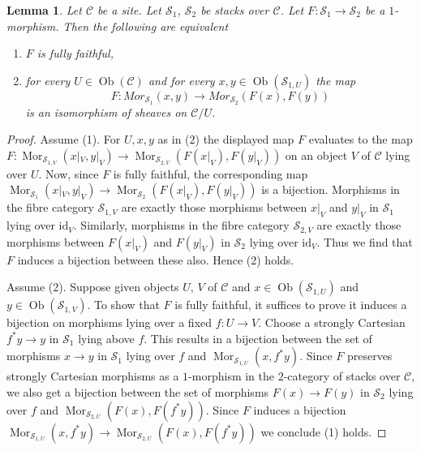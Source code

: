 \documentclass{stacks-project}
\theoremstyle{plain}
\newtheorem{lemma}[subsection]{Lemma}
\theoremstyle{definition}
\theoremstyle{remark}
\numberwithin{equation}{subsection}
\def\Mor{\mathop{\mathrm{Mor}}\nolimits}
\def\Ob{\mathop{\mathrm{Ob}}\nolimits}
\begin{document}
\begin{lemma}
\label{lemma-characterize-ff}
Let $\mathcal{C}$ be a site.
Let $\mathcal{S}_1$, $\mathcal{S}_2$ be stacks over $\mathcal{C}$.
Let $F : \mathcal{S}_1 \to \mathcal{S}_2$ be a $1$-morphism.
Then the following are equivalent
\begin{enumerate}
\item $F$ is fully faithful,
\item for every $U \in \Ob(\mathcal{C})$ and for every
$x, y \in \Ob(\mathcal{S}_{1, U})$ the map
$$
F :
\mathit{Mor}_{\mathcal{S}_1}(x, y)
\longrightarrow
\mathit{Mor}_{\mathcal{S}_2}(F(x), F(y))
$$
is an isomorphism of sheaves on $\mathcal{C}/U$.
\end{enumerate}
\end{lemma}

\begin{proof}
Assume (1). For $U, x, y$ as in (2) the displayed map $F$ evaluates to the map
$F : \Mor_{\mathcal{S}_{1, V}}(x|_V, y|_V) \to
\Mor_{\mathcal{S}_{2, V}}(F(x|_V), F(y|_V))$
on an object $V$ of $\mathcal{C}$ lying over $U$.
Now, since $F$ is fully faithful, the corresponding map
$\Mor_{\mathcal{S}_1}(x|_V, y|_V) \to \Mor_{\mathcal{S}_2}(F(x|_V), F(y|_V))$
is a bijection. Morphisms in the fibre category $\mathcal{S}_{1, V}$ are
exactly those morphisms between $x|_V$ and $y|_V$ in $\mathcal{S}_1$ lying
over $\text{id}_V$. Similarly, morphisms in the fibre category
$\mathcal{S}_{2, V}$ are exactly those morphisms between $F(x|_V)$ and
$F(y|_V)$ in $\mathcal{S}_2$ lying over $\text{id}_V$. Thus we find that $F$
induces a bijection between these also. Hence (2) holds.

\medskip\noindent
Assume (2). Suppose given objects $U$, $V$ of $\mathcal{C}$ and
$x \in \Ob(\mathcal{S}_{1, U})$ and
$y \in \Ob(\mathcal{S}_{1, V})$. To show that $F$ is fully faithful,
it suffices to prove it induces a bijection on
morphisms lying over a fixed $f : U \to V$. Choose a strongly Cartesian
$f^*y \to y$ in $\mathcal{S}_1$ lying above $f$. This results in a
bijection between the set of morphisms $x \to y$ in $\mathcal{S}_1$ lying
over $f$ and $\Mor_{\mathcal{S}_{1, U}}(x, f^*y)$. Since $F$ preserves
strongly Cartesian morphisms as a $1$-morphism in the $2$-category
of stacks over $\mathcal{C}$, we also get a bijection
between the set of morphisms $F(x) \to F(y)$ in $\mathcal{S}_2$ lying
over $f$ and $\Mor_{\mathcal{S}_{2, U}}(F(x), F(f^*y))$.
Since $F$ induces a bijection
$\Mor_{\mathcal{S}_{1, U}}(x, f^*y) \to
\Mor_{\mathcal{S}_{2, U}}(F(x), F(f^*y))$
we conclude (1) holds.
\end{proof}
\end{document}
